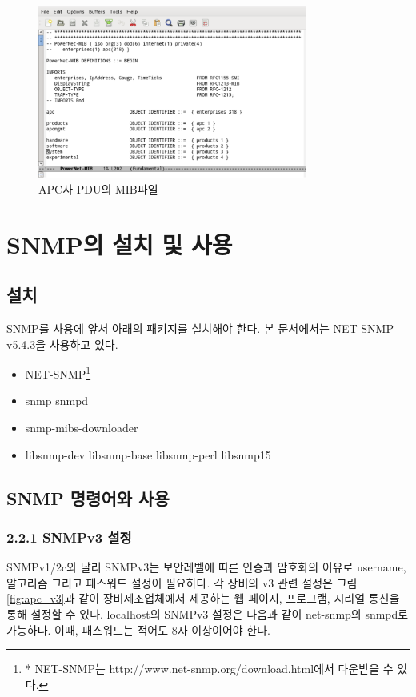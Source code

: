 \documentclass[11pt
  , a4paper
  , article
  , oneside
]{memoir}
\begin{document}
\begin{figure}[h]
  \centering
  \includegraphics[width=0.79\textwidth]{./images/pdu_mib.eps}
  \caption{APC사 PDU의 MIB파일}
  \label{fig:pdu_mib}   
\end{figure}


\clearpage

\chapter{SNMP의 설치 및 사용}
\section{설치}
SNMP를 사용에 앞서 아래의 패키지를 설치해야 한다. 본 문서에서는 NET-SNMP\citep{net_snmp} v5.4.3을 사용하고 있다.
\begin{itemize}
\item NET-SNMP\footnote{* NET-SNMP는 http://www.net-snmp.org/download.html에서 다운받을 수 있다.}
\item snmp snmpd
\item snmp-mibs-downloader
\item libsnmp-dev libsnmp-base libsnmp-perl libsnmp15 
\end{itemize}


\section{SNMP 명령어와 사용}

\subsection{2.2.1 SNMPv3 설정}
SNMPv1/2c와 달리 SNMPv3는 보안레벨에 따른 인증과 암호화의 이유로 username, 알고리즘 그리고 패스워드 설정이 필요하다. 각 장비의 v3 관련 설정은 그림 \ref{fig:apc_v3}과 같이 장비제조업체에서 제공하는 웹 페이지, 프로그램, 시리얼 통신을 통해 설정할 수 있다. localhost의 SNMPv3 설정은 다음과 같이 net-snmp의 snmpd로 가능하다. 이때, 패스워드는 적어도 8자 이상이어야 한다.
\end{document}
